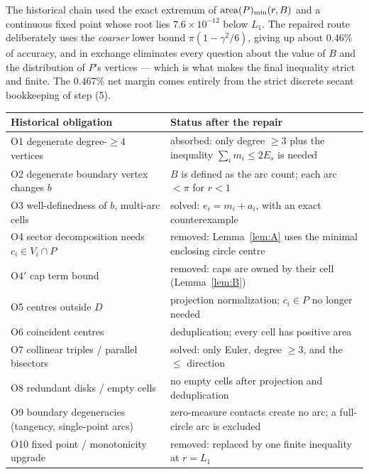 \begin{remark}
The historical chain used the exact extremum of $\operatorname{area}(P)_{\min}(r,B)$ and a continuous fixed point
whose root lies $7.6\times10^{-12}$ below $L_1$. The repaired route deliberately uses the
\emph{coarser} lower bound $\pi(1-\gamma^2/6)$, giving up about $0.46\%$ of accuracy, and in exchange
eliminates every question about the value of $B$ and the distribution of $P$'s vertices --- which is
what makes the final inequality strict and finite. The $0.467\%$ net margin comes entirely from the
strict discrete secant bookkeeping of step (5).
\end{remark}

\begin{center}
\footnotesize
\begin{tabular}{@{}>{\raggedright\arraybackslash}p{}>{\raggedright\arraybackslash}p{}@{}}
\toprule
Historical obligation & Status after the repair \\
\midrule
O1 degenerate degree-$\ge4$ vertices & absorbed: only degree $\ge3$ plus the inequality
$\sum_im_i\le2E_s$ is needed \\
O2 degenerate boundary vertex changes $b$ & $B$ is defined as the arc count; each arc
$<\!\pi$ for $r<1$ \\
O3 well-definedness of $b$, multi-arc cells & solved: $e_i=m_i+a_i$, with an exact counterexample \\
O4 sector decomposition needs $c_i\in V_i\cap P$ & removed: Lemma~\ref{lem:A} uses the minimal
enclosing circle centre \\
O4$'$ cap term bound & removed: caps are owned by their cell (Lemma~\ref{lem:B}) \\
O5 centres outside $D$ & projection normalization; $c_i\in P$ no longer needed \\
O6 coincident centres & deduplication; every cell has positive area \\
O7 collinear triples / parallel bisectors & solved: only Euler, degree $\ge3$, and the
$\le$ direction \\
O8 redundant disks / empty cells & no empty cells after projection and deduplication \\
O9 boundary degeneracies (tangency, single-point arcs) & zero-measure contacts create no arc; a
full-circle arc is excluded \\
O10 fixed point / monotonicity upgrade & removed: replaced by one finite inequality at $r=L_1$ \\
\bottomrule
\end{tabular}
\end{center}

